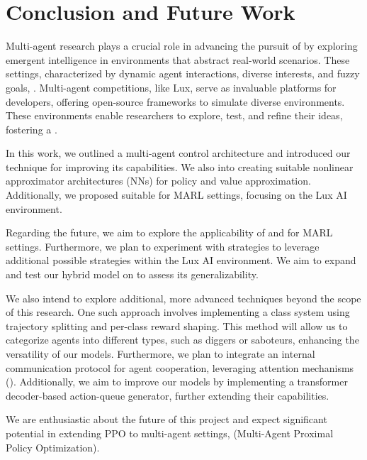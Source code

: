 \chapter{Conclusion and Future Work}
\label{ch:conc}

\noindent Multi-agent research plays a crucial role in advancing the pursuit of  by exploring emergent intelligence in environments that abstract real-world scenarios. These settings, characterized by dynamic agent interactions, diverse interests, and fuzzy goals, . Multi-agent competitions, like Lux, serve as invaluable platforms for developers, offering open-source frameworks to simulate diverse environments. These environments enable researchers to explore, test, and refine their ideas, fostering a .

\bigskip

\noindent In this work, we outlined a  multi-agent control architecture and introduced our  technique for improving its capabilities. We also  into creating suitable nonlinear approximator architectures (NNs) for policy and value approximation. Additionally, we proposed  suitable for MARL settings, focusing on the Lux AI environment.

\bigskip

\noindent Regarding the future, we aim to explore the applicability of  and  for MARL settings. Furthermore, we plan to experiment with  strategies to leverage additional possible strategies within the Lux AI environment. We aim to expand and test our hybrid model on  to assess its generalizability.

\bigskip

\noindent We also intend to explore additional, more advanced techniques beyond the scope of this research. One such approach involves implementing a class system using trajectory splitting and per-class reward shaping. This method will allow us to categorize agents into different types, such as diggers or saboteurs, enhancing the versatility of our models. Furthermore, we plan to integrate an internal communication protocol for agent cooperation, leveraging attention mechanisms (\cite{vaswani2023attention}). Additionally, we aim to improve our models by implementing a transformer decoder-based action-queue generator, further extending their capabilities.

\bigskip

\noindent We are enthusiastic about the future of this project and expect significant potential in extending PPO to multi-agent settings,  (Multi-Agent Proximal Policy Optimization).
